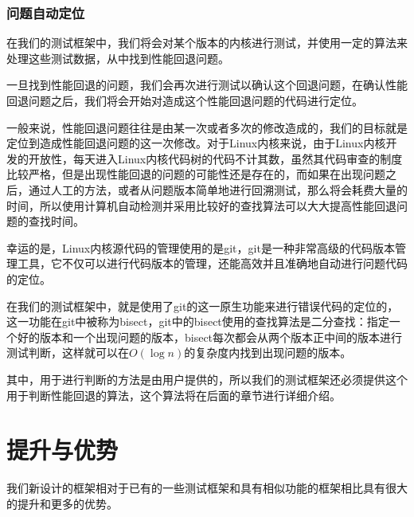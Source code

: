 \subsubsection{问题自动定位}
在我们的测试框架中，我们将会对某个版本的内核进行测试，并使用一定的算法来处理这些测试数据，从中找到性能回退问题。

一旦找到性能回退的问题，我们会再次进行测试以确认这个回退问题，在确认性能回退问题之后，我们将会开始对造成这个性能回退问题的代码进行定位。

一般来说，性能回退问题往往是由某一次或者多次的修改造成的，我们的目标就是定位到造成性能回退问题的这一次修改。对于Linux内核来说，由于Linux内核开发的开放性，每天进入Linux内核代码树的代码不计其数，虽然其代码审查的制度比较严格，但是出现性能回退的问题的可能性还是存在的，而如果在出现问题之后，通过人工的方法，或者从问题版本简单地进行回溯测试，那么将会耗费大量的时间，所以使用计算机自动检测并采用比较好的查找算法可以大大提高性能回退问题的查找时间。

幸运的是，Linux内核源代码的管理使用的是git，git是一种非常高级的代码版本管理工具，它不仅可以进行代码版本的管理，还能高效并且准确地自动进行问题代码的定位。

在我们的测试框架中，就是使用了git的这一原生功能来进行错误代码的定位的，这一功能在git中被称为bisect，git中的bisect使用的查找算法是二分查找：指定一个好的版本和一个出现问题的版本，bisect每次都会从两个版本正中间的版本进行测试判断，这样就可以在$O(\log{n})$的复杂度内找到出现问题的版本。

其中，用于进行判断的方法是由用户提供的，所以我们的测试框架还必须提供这个用于判断性能回退的算法，这个算法将在后面的章节进行详细介绍。


\section{提升与优势}

我们新设计的框架相对于已有的一些测试框架和具有相似功能的框架相比具有很大的提升和更多的优势。

